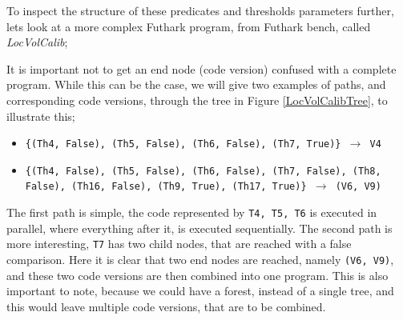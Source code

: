 \begin{center}
	\centering 
	
	\label{MatMultTreeFilled}
\end{center}
To inspect the structure of these predicates and thresholds parameters further, lets look at a more complex Futhark program, from Futhark bench, called \textit{LocVolCalib};
\begin{center}
	\centering
	
	\label{LocVolCalibTree}
\end{center}
\noindent It is important not to get an end node (code version) confused with a complete program. While this can be the case, we will give two examples of paths, and corresponding code versions, through the tree in Figure \ref{LocVolCalibTree}, to illustrate this;
\begin{itemize}
	\item \texttt{\{(Th4, False), (Th5, False), (Th6, False), (Th7, True)\} $\to$ V4}
	\item \texttt{\{(Th4, False), (Th5, False), (Th6, False), (Th7, False), (Th8, False), (Th16, False), (Th9, True), (Th17, True)\} $\to$ (V6, V9)}
\end{itemize}  
The first path is simple, the code represented by \texttt{T4, T5, T6} is executed in parallel, where everything after it, is executed sequentially. The second path is more interesting, \texttt{T7} has two child nodes, that are reached with a false comparison. Here it is clear that two end nodes are reached, namely \texttt{(V6, V9)}, and these two code versions are then combined into one program. This is also important to note, because we could have a forest, instead of a single tree, and this would leave multiple code versions, that are to be combined.




